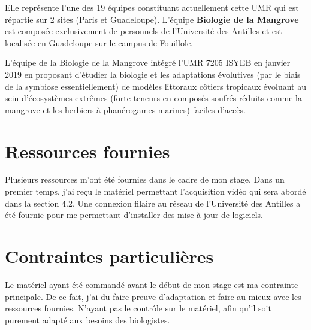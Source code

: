     \vspace{0.5cm}

    Elle représente l'une des 19 équipes constituant actuellement cette UMR qui est répartie sur 2 sites (Paris et Guadeloupe). L'équipe \textbf{Biologie de la Mangrove} est composée exclusivement de personnels de l'Université des Antilles et est localisée en Guadeloupe sur le campus de Fouillole.

    \vspace{0.5cm}
    
    L'équipe de la Biologie de la Mangrove intégré l'UMR 7205 ISYEB en janvier 2019 en proposant d'étudier la biologie et les adaptations évolutives (par le biais de la symbiose essentiellement) de modèles littoraux côtiers tropicaux évoluant au sein d'écosystèmes extrêmes (forte teneurs en composés soufrés réduits comme la mangrove et les herbiers à phanérogames marines) faciles d'accès.

    \section{Ressources fournies}
    Plusieurs ressources m'ont été fournies dans le cadre de mon stage.
    Dans un premier temps, j'ai reçu le matériel permettant l'acquisition vidéo qui sera abordé dans la section 4.2.
    Une connexion filaire au réseau de l'Université des Antilles a été fournie pour me permettant d'installer des mise à jour de logiciels.

    \section{Contraintes particulières}
    Le matériel ayant été commandé avant le début de mon stage est ma contrainte principale.
    De ce fait, j'ai du faire preuve d'adaptation et faire au mieux avec les ressources fournies.
    N'ayant pas le contrôle sur le matériel, afin qu'il soit purement adapté aux besoins des biologistes.